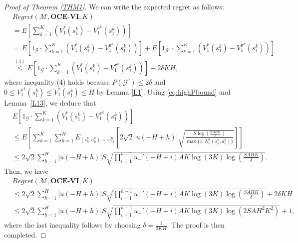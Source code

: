 \documentclass[11pt]{article}
\newcommand{\1}{\mathbbm{1}}
\begin{document}
\begin{proof}[Proof of Theorem \ref{THM1}]
We can write the expected regret as follows: 
\begin{align*}
&Regret(\mathcal{M},\textbf{OCE-VI},K)\\
&= E\left[\sum_{k=1}^K\left(V_1^*(s_1^k)-V_1^{\pi^k}(s_1^k)\right)\right]\\
&= E\left[1_{\mathcal{G}}\cdot\sum_{k=1}^K\left(V_1^*(s_1^k)-V_1^{\pi^k}(s_1^k)\right)\right]+E\left[1_{\mathcal{G}^c}\cdot\sum_{k=1}^K\left(V_1^*(s_1^k)-V_1^{\pi^k}(s_1^k)\right)\right]\\
&\overset{(4)}{\leq}  E\left[1_{\mathcal{G}}\cdot\sum_{k=1}^K\left(V_1^*(s_1^k)-V_1^{\pi^k}(s_1^k)\right)\right]+2\delta KH,
\end{align*}
where inequality (4) holds because $P(\mathcal{G}^c)\leq 2\delta$ and $0\leq V_1^{\pi^k}(s_1^k)\leq V_1^*(s_1^k)\leq H$ by Lemma \ref{L1}. Using \eqref{eq:highPbound} and Lemma~\ref{L13}, we deduce that
\begin{align*}
&E\left[1_{\mathcal{G}}\cdot\sum_{k=1}^K\left(V_1^*(s_1^k)-V_1^{\pi^k}(s_1^k)\right)\right]\\
&\leq E\left[\sum_{k=1}^K\sum_{h=1}^H E_{(s_h^k,a_h^k)\sim w_{hk}^{B}}\left [2\sqrt{2} \vert u(-H+h)\vert\sqrt{\frac{S\log\left (\frac{SAHK}{\delta}\right )}{\max\{1,N_h^k(s_h^k,a_h^k)\}}} \right ]\right]\\
&\leq 2\sqrt{2}\sum_{h=1}^H\vert u(-H+h)\vert S\sqrt{\prod\limits_{i=1}^{h-1} u_{-}'(-H+i)AK\log(3K)\log\left (\frac{SAHK}{\delta}\right )}.
\end{align*}
Then, we have 
\begin{align*}
&Regret(\mathcal{M},\textbf{OCE-VI},K)\\
&\leq 2\sqrt{2}\sum_{h=1}^H\vert u(-H+h)\vert S\sqrt{\prod\limits_{i=1}^{h-1} u_{-}'(-H+i)AK\log(3K)\log\left (\frac{SAHK}{\delta}\right )}+2\delta KH \\
&\leq 2\sqrt{2}\sum_{h=1}^H\vert u(-H+h)\vert S\sqrt{\prod\limits_{i=1}^{h-1} u_{-}'(-H+i)AK\log(3K)\log\left (2SAH^2K^2\right )}+1,
\end{align*}
 where the last inequality follows by choosing $\delta=\frac{1}{2KH}$. The proof is then completed.  
\end{proof}

\end{document}
